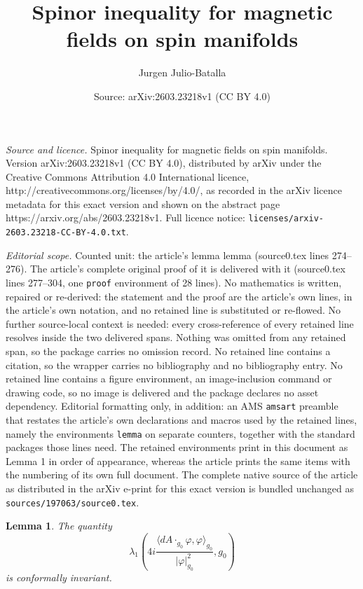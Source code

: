 \documentclass[10pt,a4paper]{amsart}
\title{Spinor inequality for magnetic fields on spin manifolds}
\author{Jurgen Julio-Batalla}
\date{Source: arXiv:2603.23218v1 (CC BY 4.0)}
\newtheorem{lemma}{Lemma}
\begin{document}
\maketitle

\noindent\emph{Source and licence.} Spinor inequality for magnetic fields on spin manifolds. Version arXiv:2603.23218v1 (CC BY 4.0), distributed by arXiv under the Creative Commons Attribution 4.0 International licence, http://creativecommons.org/licenses/by/4.0/, as recorded in the arXiv licence metadata for this exact version and shown on the abstract page https://arxiv.org/abs/2603.23218v1. Full licence notice: \texttt{licenses/arxiv-2603.23218-CC-BY-4.0.txt}.\par\smallskip

\noindent\textit{Editorial scope.} Counted unit: the article's lemma lemma (source0.tex lines 274--276). The article's complete original proof of it is delivered with it (source0.tex lines 277--304, one \texttt{proof} environment of 28 lines). No mathematics is written, repaired or re-derived: the statement and the proof are the article's own lines, in the article's own notation, and no retained line is substituted or re-flowed.  No further source-local context is needed: every cross-reference of every retained line resolves inside the two delivered spans.  Nothing was omitted from any retained span, so the package carries no omission record.  No retained line contains a citation, so the wrapper carries no bibliography and no bibliography entry.  No retained line contains a figure environment, an image-inclusion command or drawing code, so no image is delivered and the package declares no asset dependency.  Editorial formatting only, in addition: an AMS \texttt{amsart} preamble that restates the article's own declarations and macros used by the retained lines, namely the environments \texttt{lemma} on separate counters, together with the standard packages those lines need.  The retained environments print in this document as Lemma 1 in order of appearance, whereas the article prints the same items with the numbering of its own full document.  The complete native source of the article as distributed in the arXiv e-print for this exact version is bundled unchanged as \texttt{sources/197063/source0.tex}.
\begin{lemma}
The quantity $$\lambda_1\left(4i\frac{\langle dA\cdot_{g_0}\varphi,\varphi\rangle_{g_0}}{|\varphi|_{g_0}^2},g_0\right)$$ is conformally invariant.
\end{lemma}
\end{document}
